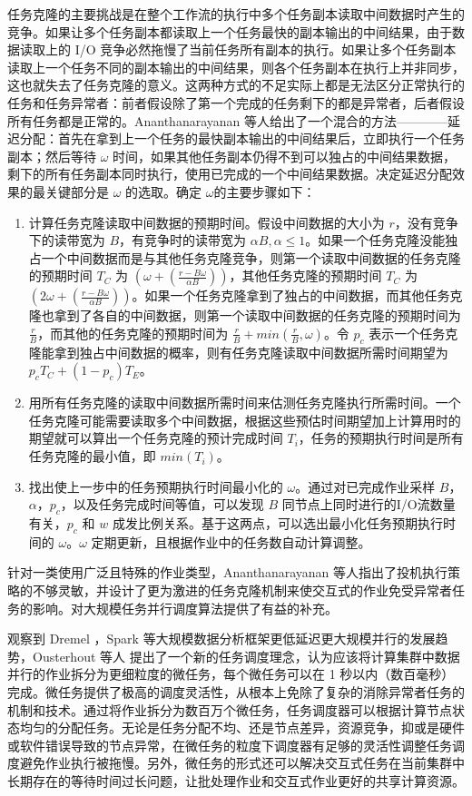 任务克隆的主要挑战是在整个工作流的执行中多个任务副本读取中间数据时产生的竞争。如果让多个任务副本都读取上一个任务最快的副本输出的中间结果，由于数据读取上的 I/O 竞争必然拖慢了当前任务所有副本的执行。如果让多个任务副本读取上一个任务不同的副本输出的中间结果，则各个任务副本在执行上并非同步，这也就失去了任务克隆的意义。这两种方式的不足实际上都是无法区分正常执行的任务和任务异常者：前者假设除了第一个完成的任务剩下的都是异常者，后者假设所有任务都是正常的。Ananthanarayanan 等人给出了一个混合的方法————延迟分配：首先在拿到上一个任务的最快副本输出的中间结果后，立即执行一个任务副本；然后等待 $\omega$ 时间，如果其他任务副本仍得不到可以独占的中间结果数据，剩下的所有任务副本同时执行，使用已完成的一个中间结果数据。决定延迟分配效果的最关键部分是 $\omega$ 的选取。确定 $\omega$的主要步骤如下：
\begin{enumerate}
\item 计算任务克隆读取中间数据的预期时间。假设中间数据的大小为 $r$，没有竞争下的读带宽为 $B$，有竞争时的读带宽为 $\alpha B, \alpha \leq 1$。如果一个任务克隆没能独占一个中间数据而是与其他任务克隆竞争，则第一个读取中间数据的任务克隆的预期时间 $T_C$ 为 $(\omega + (\frac{r - B \omega}{\alpha B}))$，其他任务克隆的预期时间 $T_C$ 为 $(2 \omega + (\frac{r - B \omega}{\alpha B}))$。如果一个任务克隆拿到了独占的中间数据，而其他任务克隆也拿到了各自的中间数据，则第一个读取中间数据的任务克隆的预期时间为 $\frac{r}{B}$，而其他的任务克隆的预期时间为 $\frac{r}{B} + min(\frac{r}{B}, \omega)$。令 $p_c$ 表示一个任务克隆能拿到独占中间数据的概率，则有任务克隆读取中间数据所需时间期望为 $p_c T_C + (1-p_c) T_E$。
\item 用所有任务克隆的读取中间数据所需时间来估测任务克隆执行所需时间。一个任务克隆可能需要读取多个中间数据，根据这些预估时间期望加上计算用时的期望就可以算出一个任务克隆的预计完成时间 $T_i$，任务的预期执行时间是所有任务克隆的最小值，即 $min(T_i)$。
\item 找出使上一步中的任务预期执行时间最小化的 $\omega$。通过对已完成作业采样 $B$，$\alpha$，$p_c$，以及任务完成时间等值，可以发现 $B$ 同节点上同时进行的I/O流数量有关，$p_c$ 和 $w$ 成发比例关系。基于这两点，可以选出最小化任务预期执行时间的 $\omega$。$\omega$ 定期更新，且根据作业中的任务数自动计算调整。
\end{enumerate}

针对一类使用广泛且特殊的作业类型，Ananthanarayanan 等人指出了投机执行策略的不够灵敏，并设计了更为激进的任务克隆机制来使交互式的作业免受异常者任务的影响。对大规模任务并行调度算法提供了有益的补充。

观察到 Dremel \cite{36632}，Spark \cite{Zaharia:2010:SCC:1863103.1863113} 等大规模数据分析框架更低延迟更大规模并行的发展趋势，Ousterhout 等人 \cite{Ousterhout:2013:CTT:2490483.2490497} 提出了一个新的任务调度理念，认为应该将计算集群中数据并行的作业拆分为更细粒度的微任务，每个微任务可以在 1 秒以内（数百毫秒）完成。微任务提供了极高的调度灵活性，从根本上免除了复杂的消除异常者任务的机制和技术。通过将作业拆分为数百万个微任务，任务调度器可以根据计算节点状态均匀的分配任务。无论是任务分配不均、还是节点差异，资源竞争，抑或是硬件或软件错误导致的节点异常，在微任务的粒度下调度器有足够的灵活性调整任务调度避免作业执行被拖慢。另外，微任务的形式还可以解决交互式任务在当前集群中长期存在的等待时间过长问题，让批处理作业和交互式作业更好的共享计算资源。

